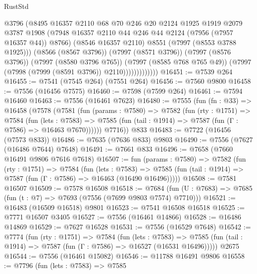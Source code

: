 \begin{lexlean}{RustStd}
\begin{coremodule}
                          @3796
                          (@8495
                            @16357
                            @2110
                            @68
                            @70
                            @246
                            @20
                            @2124
                            @1925
                            @1919
                            @2079
                            @3787
                            @1908
                            (@7948 @16357 @2110 @44 @246 @44 @2124 (@7956 (@7957 @16357 @44)) @8766)
                            (@8546 @16357 @2110)
                            @8551
                            (@7997 (@8553 @3788 @1925)))
                          (@8566 (@8567 @3796))
                          (@7997 (@8571 @3796))
                          (@7997 (@8576 @3796))
                          (@7997 (@8580 @3796 @765))
                          (@7997 (@8585 @768 @765 @49))
                          (@7997 (@7998 (@7999 (@8591 @3796)) @2110)))))))))))))
@16451 := @7539 @264
@16455 := @7541 (@7545 @264) (@7551 @264)
@16456 := @7560 @9800
@16458 := @7556 (@16456 @7575)
@16460 := @7598 (@7599 @264)
@16461 := @7594 @16460
@16463 := @7556 (@16461 @7623)
@16480 := @7555
    (fun (fn : @33) =>
    @16458
      (@7578
        (@7581
          (fun (params : @7580) =>
          @7582
            (fun (rty : @1751) =>
            @7584
              (fun (lets : @7583) =>
              @7585 (fun (tail : @1914) => @7587 (fun (Γ : @7586) => @16463 @7670))))))
        @7716))
    @833
@16483 := @7722 (@16456 (@7573 @833))
@16486 := @7635 (@7636 @833) @9803
@16490 := @7556 (@7627 (@16486 @7644) @7648)
@16491 := @7661 @833
@16496 := @7658 (@7660 @16491 @9806 @7616 @7618)
@16507 := fun (params : @7580) =>
  @7582
    (fun (rty : @1751) =>
    @7584
      (fun (lets : @7583) =>
      @7585 (fun (tail : @1914) => @7587 (fun (Γ : @7586) => @16463 (@16490 @16496)))))
@16508 := @7581 @16507
@16509 := @7578 @16508
@16518 := @7684 (fun (U : @7683) => @7685 (fun (t : @7) => @7693 (@7556 (@7699 @9803 @7574) @7710)))
@16521 := @16483 (@16509 @16518) @9801
@16523 := @7541 @16508 @16518
@16525 := @7771 @16507 @3405
@16527 := @7556 (@16461 @14866)
@16528 := @16486 @14869
@16529 := @7627 @16528
@16531 := @7556 (@16529 @7648)
@16542 := @7774
    (fun (rty : @1751) =>
    @7584
      (fun (lets : @7583) =>
      @7585 (fun (tail : @1914) => @7587 (fun (Γ : @7586) => @16527 (@16531 @16496)))))
    @2675
@16544 := @7556 (@16461 @15082)
@16546 := @11788 @16491 @9806
@16558 := @7796
    (fun (lets : @7583) =>
    @7585

\end{coremodule}
\end{lexlean}
